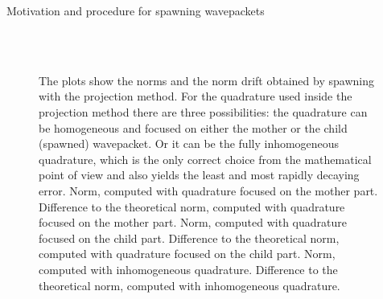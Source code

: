 \begin{chapter}{Motivation and procedure for spawning wavepackets}
\begin{figure}
{  } \\
   \\
  \caption[Comparison of quadratures used for basis projection]{
  The plots show the norms and the norm drift obtained by spawning with
  the projection method. For the quadrature used inside the projection method there
  are three possibilities: the quadrature can be homogeneous and focused on either
  the mother or the child (spawned) wavepacket. Or it can be the fully inhomogeneous
  quadrature, which is the only correct choice from the mathematical point of
  view and also yields the least and most rapidly decaying error.
   Norm, computed with quadrature focused on the mother part.
   Difference to the theoretical norm, computed with quadrature focused on the mother part.
   Norm, computed with quadrature focused on the child part.
   Difference to the theoretical norm, computed with quadrature focused on the child part.
   Norm, computed with inhomogeneous quadrature.
   Difference to the theoretical norm, computed with inhomogeneous quadrature.
  \label{fig:quadrature_choice}
  }
\end{figure}


\end{chapter}
